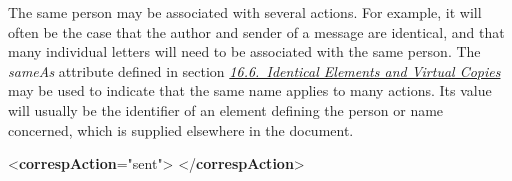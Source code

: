 The same person may be associated with several actions. For example, it will often be the case that the author and sender of a message are identical, and that many individual letters will need to be associated with the same person. The {\itshape sameAs} attribute defined in section \textit{\hyperref[SAIE]{16.6.\ Identical Elements and Virtual Copies}} may be used to indicate that the same name applies to many actions. Its value will usually be the identifier of an element defining the person or name concerned, which is supplied elsewhere in the document. \par\bgroup{}\exampleFont \begin{shaded}\noindent\mbox{}{<\textbf{correspAction}\hspace*{1em}{type}="{sent}">}\mbox{}\newline 
{}\mbox{}\newline 
{</\textbf{correspAction}>}\end{shaded}\egroup\par \noindent  \par
